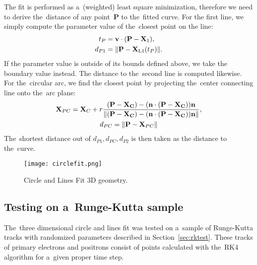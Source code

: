 			The fit is performed as a~(weighted) least square minimization, therefore we need to derive the~distance of any point~$\mathbf{P}$ to the~fitted curve. For the first line, we simply compute the parameter value of the~closest point on the line:
				\begin{equation}
					\label{eq:segdist}
					\begin{aligned}
						t_P &= \mathbf{v}\cdot(\mathbf{P}-\mathbf{X}_1),\\
						d_{P1} &= \norm{\mathbf{P}-\mathbf{X}_\text{L1}(t_P)}.
					\end{aligned}
				\end{equation}
			If the parameter value is outside of its bounds defined above, we take the boundary value instead. The distance to the~second line is computed likewise. For the~circular arc, we find the closest point by projecting the~center connecting line onto the~arc plane:
				\begin{gather}
					\mathbf{X}_{PC} = \mathbf{X}_C + r\frac{(\mathbf{P-\mathbf{X}_C})-(\mathbf{n}\cdot(\mathbf{P-\mathbf{X}_C}))\mathbf{n}}{\norm{(\mathbf{P-\mathbf{X}_C})-(\mathbf{n}\cdot(\mathbf{P-\mathbf{X}_C}))\mathbf{n}}},\\
					d_{PC} = \norm{\mathbf{P}-\mathbf{X}_{PC}}
				\end{gather}
			 The~shortest distance out of $d_{P1},d_{PC},d_{P2}$ is then taken as the distance to the~curve.
			
			\begin{figure}
				\centering
				\texttt{[image: circlefit.png]}
				\caption{Circle and Lines Fit 3D geometry.}
				\label{fig:circlefit}
			\end{figure}
			
			
			\subsection{Testing on a~Runge-Kutta sample}
				The~three dimensional circle and lines fit was tested on a~sample of Runge-Kutta tracks with randomized parameters described in Section~\ref{sec:rktest}. These tracks of primary electrons and positrons consist of points calculated with the~\ac{RK4} algorithm for a~given proper time step.
	

